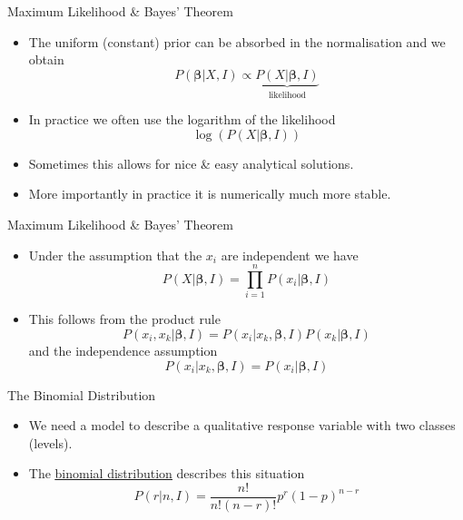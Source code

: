 \documentclass[mathserif, aspectratio=169]{beamer}
\begin{document}
\begin{frame}{Maximum Likelihood \& Bayes' Theorem}
	\begin{itemize}
		\item The uniform (constant) prior can be absorbed in the normalisation and we obtain
			\[ P(\bm{\beta}\vert X, I) \propto \underbrace{P(X\vert\bm{\beta}, I)}_\text{likelihood} \]
		\item In practice we often use the logarithm of the likelihood
			\[ \log\left( P(X\vert\bm{\beta}, I)\right) \] 
		\item Sometimes this allows for nice \& easy analytical solutions.
		\item More importantly in practice it is numerically much more stable.
	\end{itemize}
\end{frame}

\begin{frame}{Maximum Likelihood \& Bayes' Theorem}
	\begin{itemize}
		\item Under the assumption that the $x_i$ are independent we have
			\[ P(X\vert\bm{\beta}, I) = \prod_{i=1}^n P(x_i\vert\bm{\beta}, I) \]
		\item This follows from the product rule
			\[ P(x_i, x_k \vert\bm{\beta}, I) = P(x_i\vert x_k, \bm{\beta}, I) P(x_k\vert\bm{\beta}, I) \]
			and the independence assumption
			\[ P(x_i\vert x_k, \bm{\beta}, I) = P(x_i\vert\bm{\beta}, I) \]
	\end{itemize}
\end{frame}

\begin{frame}{The Binomial Distribution}
	\begin{itemize}
		\item We need a model to describe a qualitative response variable with two classes (levels).
		\item The 
			\href{https://en.wikipedia.org/wiki/Binomial_distribution}{\blue\underline{binomial distribution}}
			describes this situation
			\[
				P(r\vert n, I) =
				\frac{n!}{n!(n - r)!}
				p^r (1 - p)^{n -r}
			\]
	\end{itemize}
\end{frame}
\end{document}
